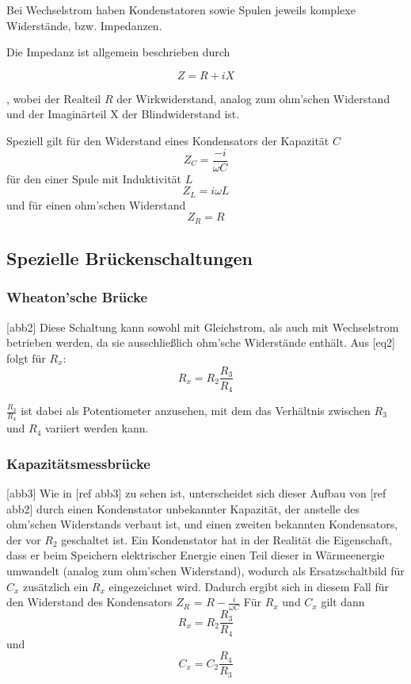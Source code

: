 Bei Wechselstrom haben Kondenstatoren sowie Spulen jeweils komplexe Widerstände, bzw. Impedanzen.

Die Impedanz ist allgemein beschrieben durch

\begin{equation}
    Z = R + iX
\end{equation}

, wobei der Realteil $R$ der Wirkwiderstand, analog zum ohm'schen Widerstand und  der Imaginärteil
X der Blindwiderstand ist. 

Speziell gilt für den Widerstand eines Kondensators der Kapazität $C$ \begin{equation}
    Z_C = \frac{-i}{\omega C}
\end{equation} für den einer Spule mit Induktivität $L$ \begin{equation}
    Z_L = i\omega L
\end{equation} und für einen ohm'schen Widerstand \begin{equation}
    Z_R = R
\end{equation}

\subsection{Spezielle Brückenschaltungen}

\subsubsection{Wheaton'sche Brücke}
[abb2]
Diese Schaltung kann sowohl mit Gleichstrom, als auch mit Wechselstrom betrieben werden, da sie ausschließlich
ohm'sche Widerstände enthält. 
Aus [eq2] folgt für $R_x$:
\begin{equation}
\label{eqn:wheaton}
 R_x = R_2 \frac{R_3}{R_4}
\end{equation}

$\frac{R_3}{R_4}$ ist dabei als Potentiometer anzusehen, mit dem das Verhältnis zwischen $R_3$ und $R_4$ 
variiert werden kann. 

\subsubsection{Kapazitätsmessbrücke}
[abb3]
Wie in [ref abb3] zu sehen ist, unterscheidet sich dieser Aufbau von [ref abb2] durch 
einen Kondenstator unbekannter Kapazität, der anstelle des ohm'schen Widerstands verbaut ist, und einen zweiten
bekannten Kondensators, der vor $R_2$ geschaltet ist. 
Ein Kondenstator hat in der 
Realität die Eigenschaft, dass er beim Speichern elektrischer Energie einen Teil dieser in Wärmeenergie umwandelt
(analog zum ohm'schen Widerstand),
wodurch als Ersatzschaltbild für $C_x$ zusätzlich ein $R_x$ eingezeichnet wird. 
Dadurch ergibt sich in diesem Fall für den Widerstand des Kondensators $ Z_R$ = $R - \frac{i}{\omega C}$
Für $R_x$ und $C_x$ gilt dann 
\begin{equation}
\label{eqn:kapa1}
  R_x = R_2 \frac{R_3}{R_4} 
\end{equation}
 \quad und
\begin{equation}
\label{eqn:kapa2}
   C_x = C_2 \frac{R_4}{R_3} 
\end{equation}


